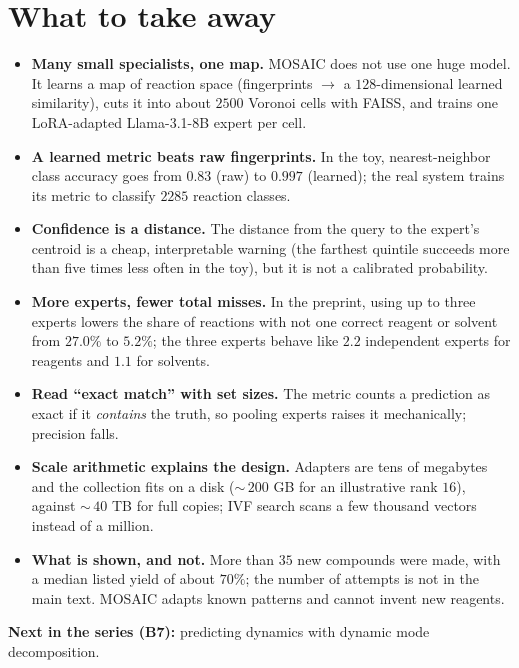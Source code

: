 \documentclass[11pt]{article}
\begin{document}
\section{What to take away}
\begin{keybox}[Summary]
\begin{itemize}[nosep]
  \item \textbf{Many small specialists, one map.} MOSAIC does not use one huge model. It learns a map of reaction space (fingerprints $\to$ a $128$-dimensional learned similarity), cuts it into about $2500$ Voronoi cells with FAISS, and trains one LoRA-adapted Llama-3.1-8B expert per cell.
  \item \textbf{A learned metric beats raw fingerprints.} In the toy, nearest-neighbor class accuracy goes from $0.83$ (raw) to $0.997$ (learned); the real system trains its metric to classify $2285$ reaction classes.
  \item \textbf{Confidence is a distance.} The distance from the query to the expert's centroid is a cheap, interpretable warning (the farthest quintile succeeds more than five times less often in the toy), but it is not a calibrated probability.
  \item \textbf{More experts, fewer total misses.} In the preprint, using up to three experts lowers the share of reactions with not one correct reagent or solvent from $27.0\%$ to $5.2\%$; the three experts behave like $2.2$ independent experts for reagents and $1.1$ for solvents.
  \item \textbf{Read ``exact match'' with set sizes.} The metric counts a prediction as exact if it \emph{contains} the truth, so pooling experts raises it mechanically; precision falls.
  \item \textbf{Scale arithmetic explains the design.} Adapters are tens of megabytes and the collection fits on a disk ($\sim$\,$200$ GB for an illustrative rank $16$), against $\sim$\,$40$ TB for full copies; IVF search scans a few thousand vectors instead of a million.
  \item \textbf{What is shown, and not.} More than $35$ new compounds were made, with a median listed yield of about $70\%$; the number of attempts is not in the main text. MOSAIC adapts known patterns and cannot invent new reagents.
\end{itemize}
\end{keybox}

\textbf{Next in the series (B7):} predicting dynamics with dynamic mode decomposition.
\end{document}

